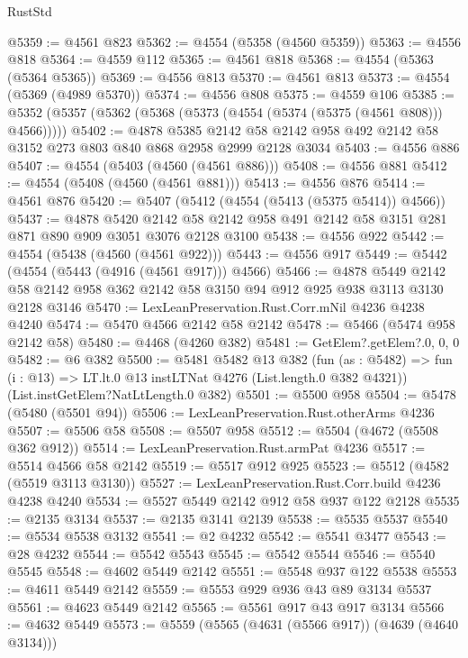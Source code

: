 \begin{lexlean}{RustStd}
\begin{coremodule}
@5359 := @4561 @823
@5362 := @4554 (@5358 (@4560 @5359))
@5363 := @4556 @818
@5364 := @4559 @112
@5365 := @4561 @818
@5368 := @4554 (@5363 (@5364 @5365))
@5369 := @4556 @813
@5370 := @4561 @813
@5373 := @4554 (@5369 (@4989 @5370))
@5374 := @4556 @808
@5375 := @4559 @106
@5385 := @5352 (@5357 (@5362 (@5368 (@5373 (@4554 (@5374 (@5375 (@4561 @808))) @4566)))))
@5402 := @4878
    @5385
    @2142
    @58
    @2142
    @958
    @492
    @2142
    @58
    @3152
    @273
    @803
    @840
    @868
    @2958
    @2999
    @2128
    @3034
@5403 := @4556 @886
@5407 := @4554 (@5403 (@4560 (@4561 @886)))
@5408 := @4556 @881
@5412 := @4554 (@5408 (@4560 (@4561 @881)))
@5413 := @4556 @876
@5414 := @4561 @876
@5420 := @5407 (@5412 (@4554 (@5413 (@5375 @5414)) @4566))
@5437 := @4878
    @5420
    @2142
    @58
    @2142
    @958
    @491
    @2142
    @58
    @3151
    @281
    @871
    @890
    @909
    @3051
    @3076
    @2128
    @3100
@5438 := @4556 @922
@5442 := @4554 (@5438 (@4560 (@4561 @922)))
@5443 := @4556 @917
@5449 := @5442 (@4554 (@5443 (@4916 (@4561 @917))) @4566)
@5466 := @4878
    @5449
    @2142
    @58
    @2142
    @958
    @362
    @2142
    @58
    @3150
    @94
    @912
    @925
    @938
    @3113
    @3130
    @2128
    @3146
@5470 := LexLeanPreservation.Rust.Corr.mNil @4236 @4238 @4240
@5474 := @5470 @4566 @2142 @58 @2142
@5478 := @5466 (@5474 @958 @2142 @58)
@5480 := @4468 (@4260 @382)
@5481 := GetElem?.getElem?.{0, 0, 0}
@5482 := @6 @382
@5500 := @5481
    @5482
    @13
    @382
    (fun (as : @5482) =>
    fun (i : @13) => LT.lt.{0} @13 instLTNat @4276 (List.length.{0} @382 @4321))
    (List.instGetElem?NatLtLength.{0} @382)
@5501 := @5500 @958
@5504 := @5478 (@5480 (@5501 @94))
@5506 := LexLeanPreservation.Rust.otherArms @4236
@5507 := @5506 @58
@5508 := @5507 @958
@5512 := @5504 (@4672 (@5508 @362 @912))
@5514 := LexLeanPreservation.Rust.armPat @4236
@5517 := @5514 @4566 @58 @2142
@5519 := @5517 @912 @925
@5523 := @5512 (@4582 (@5519 @3113 @3130))
@5527 := LexLeanPreservation.Rust.Corr.build @4236 @4238 @4240
@5534 := @5527 @5449 @2142 @912 @58 @937 @122 @2128
@5535 := @2135 @3134
@5537 := @2135 @3141 @2139
@5538 := @5535 @5537
@5540 := @5534 @5538 @3132
@5541 := @2 @4232
@5542 := @5541 @3477
@5543 := @28 @4232
@5544 := @5542 @5543
@5545 := @5542 @5544
@5546 := @5540 @5545
@5548 := @4602 @5449 @2142
@5551 := @5548 @937 @122 @5538
@5553 := @4611 @5449 @2142
@5559 := @5553 @929 @936 @43 @89 @3134 @5537
@5561 := @4623 @5449 @2142
@5565 := @5561 @917 @43 @917 @3134
@5566 := @4632 @5449
@5573 := @5559 (@5565 (@4631 (@5566 @917)) (@4639 (@4640 @3134)))

\end{coremodule}
\end{lexlean}
